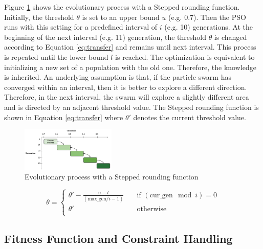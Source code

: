 \documentclass[10pt,journal,compsoc]{IEEEtran}
\begin{document}
Figure \ref{fig:adaptive} shows the evolutionary process with a Stepped rounding function. %
Initially, the threshold $\theta$ is set to an upper bound $u$ (e.g. 0.7). Then the PSO runs with this setting for a predefined interval of $i$ (e.g. 10) generations. At the beginning of the next interval (e.g. 11) generation, the threshold $\theta$ is changed according to Equation \ref{eq:transfer} and remains until next interval. This process is repeated until the lower bound $l$ is reached. The optimization is equivalent to initializing a new set of a population with the old one. Therefore, the knowledge is inherited. An underlying assumption is that, if the particle swarm has converged within an interval, then it is better to explore a different direction. Therefore, in the next interval, the swarm will explore a slightly different area and is directed by an adjacent threshold value. 
The Stepped rounding function is shown in Equation \ref{eq:transfer} where $\theta'$ denotes the current threshold value.

\begin{figure}[H]
 \centering
   \includegraphics[width=0.4\textwidth]{pics/transfer.eps}
   \caption{Evolutionary process with a Stepped rounding function}
   \label{fig:adaptive}
 \end{figure}

\begin{equation}
\label{eq:transfer}
  \theta =
  \begin{cases}
   \theta' - \frac{u - l}{(\text{max\_gen}/i - 1)} & \quad \text{if } (\text{cur\_gen}\mod i) = 0\\
   \theta' & \quad \text{otherwise} \\
  \end{cases}
\end{equation}


\vspace{-3 mm}
\subsection{Fitness Function and Constraint Handling}
\end{document}
